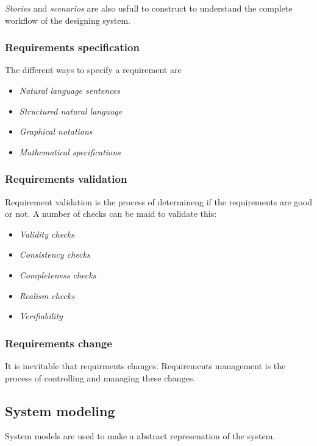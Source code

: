 \textit{Stories} and \textit{scenarios} are also usfull to construct to understand the complete workflow
of the designing system.

\subsubsection{Requirements specification}
The different ways to specify a requirement are
\begin{itemize}
\item \textit{Natural language sentences}
\item \textit{Structured natural language}
\item \textit{Graphical notations}
\item \textit{Mathematical specifications}
\end{itemize}
  
\subsubsection{Requirements validation}
Requirement validation is the process of determineng if the requirements are good or not.
A number of checks can be maid to validate this:
\begin{itemize}
\item \textit{Validity checks}
\item \textit{Consistency checks}
\item \textit{Completeness checks}
\item \textit{Realism checks}
\item \textit{Verifiability}
\end{itemize}
 
\subsubsection{Requirements change}
It is inevitable that requirments changes. Requirements management is the process of controlling and managing these changes.


\subsection{System modeling}
System models are used to make a abstract represenation of the system.

